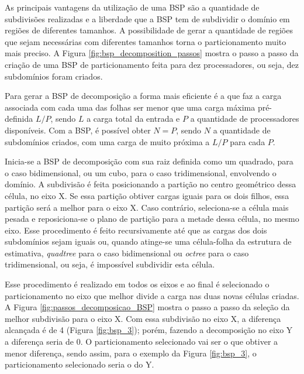 As principais vantagens da utilização de uma BSP são a quantidade de subdivisões realizadas e a liberdade que a BSP tem de subdividir o domínio em regiões de diferentes tamanhos. A possibilidade de gerar a quantidade de regiões que sejam necessárias com diferentes tamanhos torna o particionamento muito mais preciso. A Figura \ref{fig:bsp_decomposition_passos} mostra o passo a passo da criação de uma BSP de particionamento feita para dez processadores, ou seja, dez subdomínios foram criados.

Para gerar a BSP de decomposição a forma mais eficiente é a que faz a carga associada com cada uma das folhas ser menor que uma carga máxima pré-definida $L/P$, sendo $L$ a carga total da entrada e $P$ a quantidade de processadores disponíveis. Com a BSP, é possível obter $N=P$, sendo $N$ a quantidade de subdomínios criados, com uma carga de muito próxima a $L/P$ para cada $P$.

Inicia-se a BSP de decomposição com sua raiz definida como um quadrado, para o caso bidimensional, ou um cubo, para o caso tridimensional, envolvendo o domínio. A subdivisão é feita posicionando a partição no centro geométrico dessa célula, no eixo X. Se essa partição obtiver cargas iguais para os dois filhos, essa partição será a melhor para o eixo X. Caso contrário, seleciona-se a célula mais pesada e reposiciona-se o plano de partição para a metade dessa célula, no mesmo eixo. Esse procedimento é feito recursivamente até que as cargas dos dois subdomínios sejam iguais ou, quando atinge-se uma célula-folha da estrutura de estimativa, \textit{quadtree} para o caso bidimensional ou \textit{octree} para o caso tridimensional, ou seja, é impossível subdividir esta célula.

Esse procedimento é realizado em todos os eixos e ao final é selecionado o particionamento no eixo que melhor divide a carga nas duas novas células criadas. A Figura \ref{fig:passos_decomposicao_BSP} mostra o passo a passo da seleção da melhor subdivisão para o eixo X. Com essa subdivisão no eixo X, a diferença alcançada é de 4 (Figura \ref{fig:bsp_3}); porém, fazendo a decomposição no eixo Y a diferença seria de $0$. O particionamento selecionado vai ser o que obtiver a menor diferença, sendo assim, para o exemplo da Figura \ref{fig:bsp_3}, o particionamento selecionado seria o do Y.



